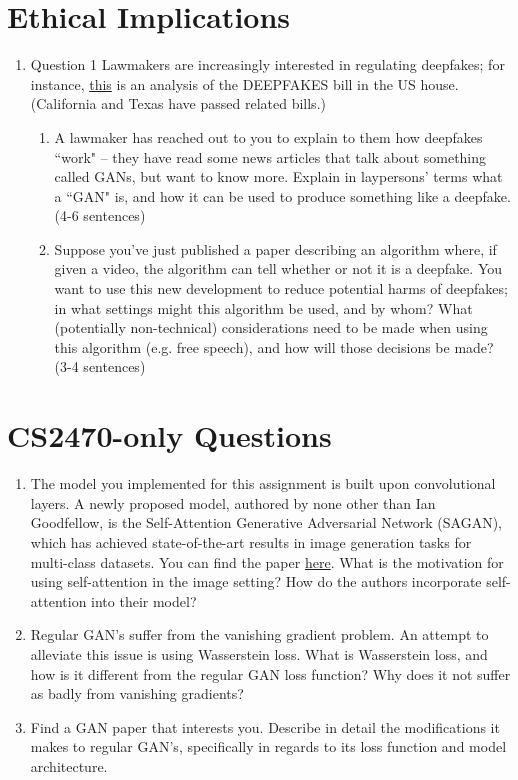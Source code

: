 \documentclass{article}
\begin{document}
\section{Ethical Implications}
\begin{enumerate}
\item Question 1
Lawmakers are increasingly interested in regulating deepfakes; for instance, \href{https://techcrunch.com/2019/06/13/deepfakes-accountability-act-would-impose-unenforceable-rules-but-its-a-start/}{this} is an analysis of the DEEPFAKES bill in the US house. (California and Texas have passed related bills.) 

\begin{enumerate}
    \item A lawmaker has reached out to you to explain to them how deepfakes ``work" -- they have read some news articles that talk about something called GANs, but want to know more. Explain in laypersons' terms what a ``GAN" is, and how it can be used to produce something like a deepfake. (4-6 sentences)
    \item Suppose you've just published a paper describing an algorithm where, if given a video, the algorithm can tell whether or not it is a deepfake. You want to use this new development to reduce potential harms of deepfakes; in what settings might this algorithm be used, and by whom? 
    What (potentially non-technical) considerations need to be made when using this algorithm (e.g. free speech), and how will those decisions be made? (3-4 sentences)
    
\end{enumerate}
\end{enumerate}

\section{CS2470-only Questions}

\begin{enumerate}
\item The model you implemented for this assignment is built upon convolutional layers. A newly proposed model, authored by none other than Ian Goodfellow, is the Self-Attention Generative Adversarial Network (SAGAN), which has achieved state-of-the-art results in image generation tasks for multi-class datasets. You can find the paper \href{https://arxiv.org/abs/1805.08318}{here}. What is the motivation for using self-attention in the image setting? How do the authors incorporate self-attention into their model? 
\item Regular GAN's suffer from the vanishing gradient problem. An attempt to alleviate this issue is using Wasserstein loss. What is  Wasserstein loss, and how is it different from the regular GAN loss function? Why does it not suffer as badly from vanishing gradients?
\item  Find a GAN paper that interests you. Describe in detail the modifications it makes to regular GAN's, specifically in regards to its loss function and model architecture.
\end{enumerate}
\end{document}
